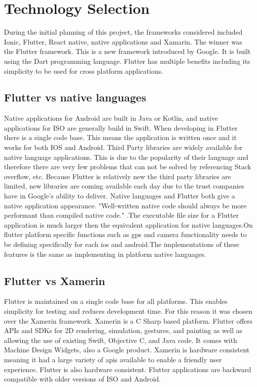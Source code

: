 \section{Technology Selection}
During the initial planning of this project, the frameworks considered included Ionic, Flutter, React native, native applications and Xamarin. The winner was the Flutter framework. This is a new framework introduced by Google. It is built using the Dart programming language. Flutter has multiple benefits including its simplicity to be used for cross platform applications.


\subsection{Flutter vs native languages}
Native applications for Android are built in Java or Kotlin, and native applications for ISO are generally build in Swift. When developing in Flutter there is a single code base. This means the application is written once and it works for both IOS and Android. Third Party libraries are widely available for native language applications. This is due to the popularity of their language and therefore there are very few problems that can not be solved by referencing Stack overflow, etc. Because Flutter is relatively new the third party libraries are limited, new libraries are coming available each day due to the trust companies have in Google’s ability to deliver. Native languages and Flutter both give a native application appearance. "Well-written native code should always be more performant than compiled native code." \cite{FlutterVS_2018}.The executable file size for a Flutter application is much larger then the equivalent application for native languages.On flutter platform specific functions such as gps and camera functionality needs to be defining specifically for each ios and android.The implementations of these features is the same as implementing in platform native languages.\cite{flutter_application}

\subsection{Flutter vs Xamerin}
Flutter is maintained on a single code base for all platforms. This enables simplicity for testing and reduces development time. For this reason it was chosen over the Xamerin framework. Xamerin is a C Sharp based platform. Flutter offers APIs and SDKs for 2D rendering, simulation, gestures, and painting as well as allowing the use of existing Swift, Objective C, and Java code. It comes with Machine Design Widgets, also a Google product. \cite{flutterVsXamarin}Xamerin is hardware consistent meaning it had a large variety of apis available to enable a friendly user experience. Flutter is also hardware consistent. Flutter applications are backward compatible with older versions of ISO and Android.\cite{flutterVsReactVsXamarin}

